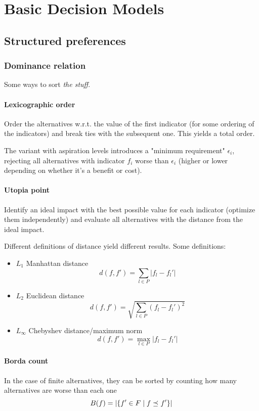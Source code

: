 \section{Basic Decision Models}

\subsection{Structured preferences}

\subsubsection{Dominance relation}

Some ways to sort \textit{the stuff}.

\paragraph{Lexicographic order} Order the alternatives w.r.t. the value of the first indicator (for some ordering of the indicators) and break ties with the subsequent one. This yields a total order.

The variant with aspiration levels introduces a "minimum requirement" $\epsilon_i$, rejecting all alternatives with indicator $f_i$ worse than $\epsilon_i$ (higher or lower depending on whether it's a benefit or cost).

\paragraph{Utopia point} Identify an ideal impact with the best possible value for each indicator (optimize them independently) and evaluate all alternatives with the distance from the ideal impact. 

Different definitions of distance yield different results. Some definitions:
\begin{itemize}
	\item $L_1$ Manhattan distance
	$$ d(f, f') = \sum_{l \in P} |f_l - f_l'|$$
	
	\item $L_2$ Euclidean distance
	$$ d(f, f') = \sqrt{\sum_{l \in P} \left(f_l - f_l'\right)^2} $$
	
	\item $L_\infty$ Chebyshev distance/maximum norm
	$$ d(f,f') = \max_{l \in P} |f_l - f_l'| $$
\end{itemize}

\paragraph{Borda count} In the case of finite alternatives, they can be sorted by counting how many alternatives are worse than each one
$$ B(f) = \left|\left\{f' \in F \mid f \preceq_{} f' \right\}\right| $$

